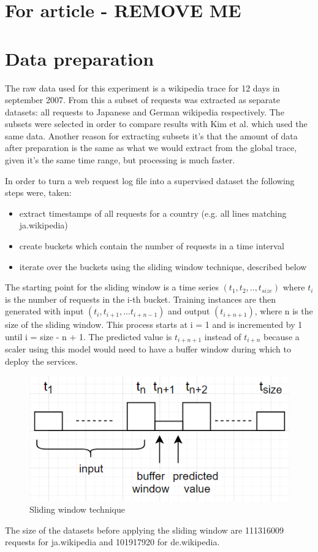 \documentclass[12pt]{article}
\begin{document}
  \section{For article - REMOVE ME}
  \section{Data preparation}
  The raw data used for this experiment is a wikipedia 
  trace for 12 days in september 2007\cite{wikidata}. 
  From this a subset of requests was 
  extracted as separate datasets: all requests to Japanese and German wikipedia
  respectively. 
  The subsets were selected 
  in order to compare results with Kim et al.\cite{CloudInsight} which used 
  the same data. Another reason for extracting subsets it's that the 
  amount of data after preparation is the same as what we would extract from the global
  trace, given it's the same time range,
  but processing is much faster.

  In order to turn a web request log file into a supervised dataset the following steps were,
  taken: 
  \begin{itemize}
  \item extract timestamps of all requests for a country (e.g. all lines matching ja.wikipedia)
  \item create buckets which contain the number of requests in a
  time interval
  \item iterate over the buckets using the sliding window technique\cite{sliding_window}, described below
  \end{itemize}
  
  The starting point for the sliding window is a time series 
  $(t_1, t_2, .., t_{size})$
  where $t_i$ is the number of requests in the i-th bucket.
  Training instances are then generated with input 
  $(t_{i}, t_{i+1}, ... t_{i+n-1})$
  and output $(t_{i+n+1})$, 
  where n is the size of the sliding window. 
  This process starts at i = 1 and is incremented by 1 until i = size - n + 1. 
  The predicted value is $t_{i+n+1}$ instead of $t_{i+n}$ because a scaler using this model 
  would need to have a buffer window during which to deploy the services.

  \begin{figure}
    \includegraphics[width=\linewidth]{resources/data/prepare.png}
    \caption{Sliding window technique}
    \label{fig:sliding_window}
  \end{figure}

  The size of the datasets before applying the sliding window are 111316009 requests 
  for ja.wikipedia and 101917920 for de.wikipedia.

  \newpage
  {}
  
\end{document}

